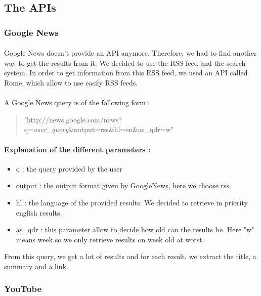 \documentclass[10pt, a4paper]{article}
\begin{document}
\subsection{The APIs}

\subsubsection{Google News}
\paragraph{}Google News doesn't provide an API anymore. Therefore, we had to find another way to get the results from it. We decided to use the RSS feed and the search system. In order to get information from this RSS feed, we used an API called Rome, which allow to use easily RSS feeds.

\paragraph{}A Google News query is of the following form :

\begin{quote}
"http://news.google.com/news?q=\textit{user\_query}\&output=rss\&hl=en\&as\_qdr=w"
\end{quote}

\paragraph{Explanation of the different parameters : }
\begin{itemize}
	\item q : the query provided by the user
	\item output : the output format given by GoogleNews, here we choose rss.
	\item hl : the language of the provided results. We decided to retrieve in priority english results.
	\item as\_qdr : this parameter allow to decide how old can the results be. Here "w" means week so we only retrieve results on week old at worst.
\end{itemize}

\paragrapg{}From this query, we get a lot of results and for each result, we extract the title, a summary and a link.

\subsubsection{YouTube}
\end{document}

